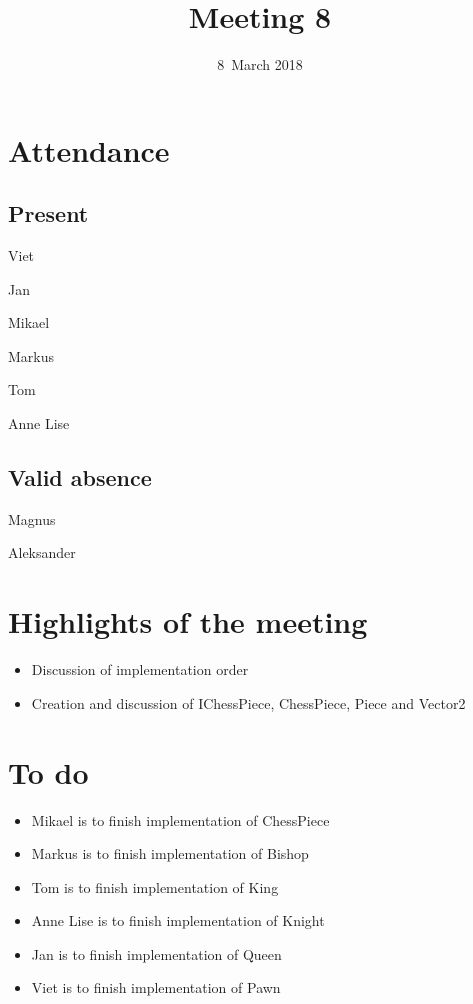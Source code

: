 \documentclass[letterpaper,11pt]{article}
\title{Meeting 8}
\date{8~March 2018}
\begin{document}
\maketitle
\section*{Attendance}
\subsection*{Present}
\begin{list}{}{}
	\item Viet
	\item Jan
	\item Mikael
	\item Markus
	\item Tom
	\item Anne Lise
\end{list}
\subsection*{Valid absence}
\begin{list}{}{}
	\item Magnus
	\item Aleksander
\end{list}

\newpage
\section*{Highlights of the meeting}
\begin{itemize}
	\item Discussion of implementation order
	\item Creation and discussion of IChessPiece, ChessPiece, Piece and Vector2
\end{itemize}

\section*{To do}
\begin{itemize}
	\item Mikael is to finish implementation of ChessPiece
	\item Markus is to finish implementation of Bishop
	\item Tom is to finish implementation of King
	\item Anne Lise is to finish implementation of Knight
	\item Jan is to finish implementation of Queen
	\item Viet is to finish implementation of Pawn
\end{itemize}
\end{document}
